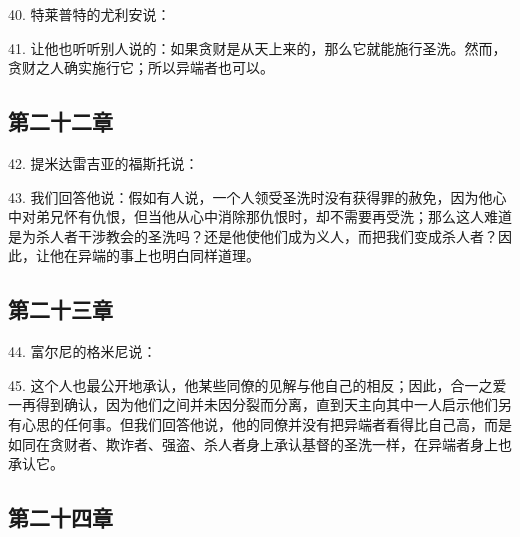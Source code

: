 40. 特莱普特的尤利安说：\par

41. 让他也听听别人说的：如果贪财是从天上来的，那么它就能施行圣洗。然而，贪财之人确实施行它；所以异端者也可以。\par


\subsection{第二十二章}

42. 提米达雷吉亚的福斯托说：\par

43. 我们回答他说：假如有人说，一个人领受圣洗时没有获得罪的赦免，因为他心中对弟兄怀有仇恨，但当他从心中消除那仇恨时，却不需要再受洗；那么这人难道是为杀人者干涉教会的圣洗吗？还是他使他们成为义人，而把我们变成杀人者？因此，让他在异端的事上也明白同样道理。\par


\subsection{第二十三章}

44. 富尔尼的格米尼说：\par

45. 这个人也最公开地承认，他某些同僚的见解与他自己的相反；因此，合一之爱一再得到确认，因为他们之间并未因分裂而分离，直到天主向其中一人启示他们另有心思的任何事。但我们回答他说，他的同僚并没有把异端者看得比自己高，而是如同在贪财者、欺诈者、强盗、杀人者身上承认基督的圣洗一样，在异端者身上也承认它。\par


\subsection{第二十四章}

